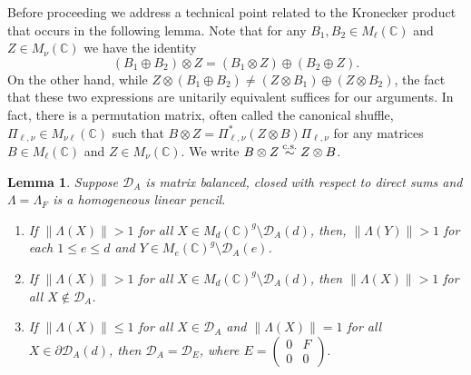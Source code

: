 \documentclass[12pt,makeidx]{amsart}
\newtheorem{lemma}[theorem]{Lemma}
\def\beq{\begin{equation}}
\def\eeq{\end{equation}}
\numberwithin{equation}{section}
\def\cD{ {{\mathcal D}}}
\def\bbF{ {\mathbb C}}
\def\C{ {\mathbb{C}} }
\def\cD{ {\mathcal D} }
\def\La{\Lambda}
\def\cs{\stackrel{\rm c.s.}{\sim}}
\begin{document}
Before proceeding we address a technical point related to the Kronecker product that occurs in the following lemma. Note that 
for any $B_1, B_2 \in M_\ell(\C)$ and $Z \in M_{\nu}(\C)$ we have the identity
\beq
\label{eq:tensordirectsumidentity}
(B_1 \oplus B_2) \otimes Z=(B_1 \otimes Z) \oplus (B_2 \oplus Z).
\eeq
On the other hand, while $Z\otimes (B_1\oplus B_2)\neq
(Z\otimes B_1)\oplus (Z\otimes B_2)$, the fact that these two expressions are unitarily equivalent suffices for our arguments.
In fact, there is a permutation matrix, often called the canonical shuffle,
$\Pi_{\ell, \nu}\in M_{\nu\ell}(\C)$
 such that $B \otimes Z= \Pi_{\ell, \nu}^* (Z \otimes B) \Pi_{\ell, \nu}$
for any matrices $B \in M_\ell(\C)$ and $Z \in M_{\nu}(\C)$. 
We write $B\otimes Z\cs Z\otimes B$.

\begin{lemma}
\label{lem:lambdaball}
 {Suppose $\cD_A$ is matrix balanced, closed with respect to direct sums  and} $\Lambda=\La_F$ is a homogeneous linear pencil. 
\begin{enumerate}[label={\rm(\roman*)}]
 \item \label{it:0} If $\|\Lambda(X)\|>1$ for all $X\in M_d(\bbF)^g\setminus \cD_A(d)$, then, $\|\Lambda(Y)\|>1$ for each $1\le e\le d$ and 
    $Y\in M_e(\C)^g\setminus  \cD_A(e)$.
 \item \label{it:notinA} If $\|\Lambda(X)\|> 1$ for all $X\in M_d(\bbF)^g \setminus  \cD_A(d)$, then $\|\Lambda(X)\|> 1$ for all $X\notin \cD_A$.
 \item \label{it:lambdaball} If  $\|\Lambda(X)\|\le 1$ for all $X\in \cD_A$ and $\|\Lambda(X)\|=1$ for all $X\in \partial \cD_A(d)$, then $\cD_A=\cD_E$, where
$
 E = \begin{pmatrix} 0 & F \\ 0 & 0 \end{pmatrix}.
$
\end{enumerate}
\end{lemma}
\end{document}
